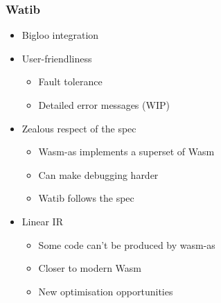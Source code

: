 \documentclass{beamer}
\begin{document}
\begin{frame}
  \frametitle{Watib}
  \begin{itemize}
    \item Bigloo integration\pause
    \item User-friendliness
      \begin{itemize}
        \item Fault tolerance
        \item Detailed error messages (WIP)
      \end{itemize}\pause
    \item Zealous respect of the spec
      \begin{itemize}
        \item Wasm-as implements a superset of Wasm
        \item Can make debugging harder
        \item Watib follows the spec
      \end{itemize}\pause
    \item Linear IR
      \begin{itemize}
        \item Some code can't be produced by wasm-as
        \item Closer to modern Wasm
        \item New optimisation opportunities
      \end{itemize}
  \end{itemize}
\end{frame}
\end{document}
